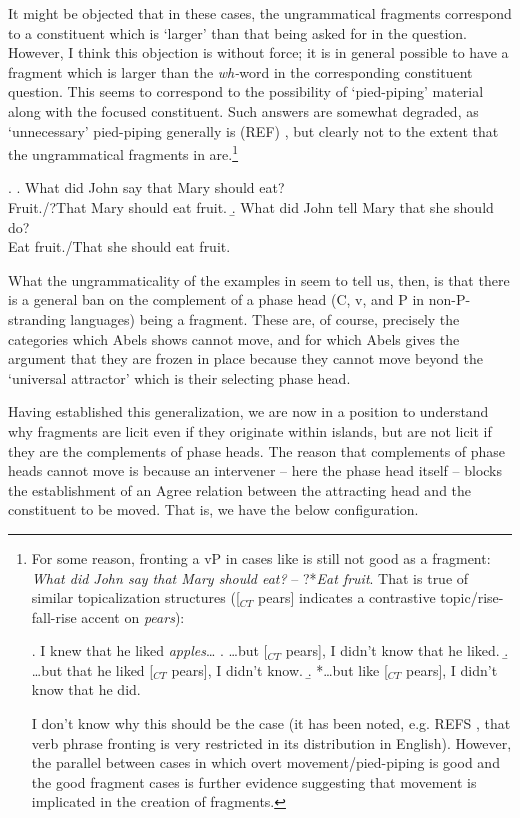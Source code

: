 \documentclass[11pt,letterpaper]{article}
\begin{document}
 It might be objected that in these cases, the ungrammatical fragments correspond to a constituent which is `larger' than that being asked for in the question.
 However, I think this objection is without force; it is in general possible to have a fragment which is larger than the {\it wh-}word in the corresponding constituent question.
 This seems to correspond to the possibility of `pied-piping' material along with the focused constituent.
 Such answers are somewhat degraded, as `unnecessary' pied-piping generally is (REF) %
 , but clearly not to the extent that the ungrammatical fragments in \Last are.\footnote{For some reason, fronting a vP in cases like \TextNext[a] is still not good as a fragment: {\it What did John say that Mary should eat?} -- ?*{\it Eat fruit}.
 		That is true of similar topicalization structures ([$_{CT}$ pears] indicates a contrastive topic/rise-fall-rise accent on {\it pears}):
 		
 		\ex. 	I knew that he liked {\it apples}\ldots
 			\a. \ldots but [$_{CT}$ pears], I didn't know that he liked.
 			\b. \ldots but that he liked [$_{CT}$ pears], I didn't know.
 			\b. *\ldots but like [$_{CT}$ pears], I didn't know that he did.
 			
 		I don't know why this should be the case (it has been noted, e.g. REFS %
 		, that verb phrase fronting is very restricted in its distribution in English).
 		However, the parallel between cases in which overt movement/pied-piping is good and the good fragment cases is further evidence suggesting that movement is implicated in the creation of fragments.}
 
 \ex. 	\a. 	What did John say that Mary should eat?\\
 		Fruit./?That Mary should eat fruit.
 	\b. 	What did John tell Mary that she should do?\\
 		Eat fruit./That she should eat fruit.
 		
 What the ungrammaticality of the examples in \LLast seem to tell us, then, is that there is a general ban on the complement of a phase head (C, v, and P in non-P-stranding languages) being a fragment.
 These are, of course, precisely the categories which Abels shows cannot move, and for which Abels gives the argument that they are frozen in place because they cannot move beyond the `universal attractor' which is their selecting phase head.
 
 Having established this generalization, we are now in a position to understand why fragments are licit even if they originate within islands, but are not licit if they are the complements of phase heads.
 The reason that complements of phase heads cannot move is because an intervener -- here the phase head itself -- blocks the establishment of an Agree relation between the attracting head and the constituent to be moved.
 That is, we have the below configuration.
 
\end{document}
